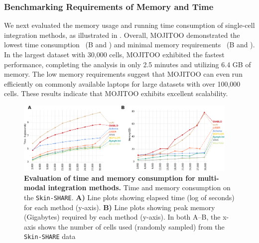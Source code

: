 \subsubsection{Benchmarking Requirements of Memory and Time}
We next evaluated the memory usage and running time consumption of single-cell integration methods, as illustrated in . Overall, MOJITOO demonstrated the lowest time consumption ~(B and ) and minimal memory requirements ~(B and ). In the largest dataset with 30,000 cells, MOJITOO exhibited the fastest performance, completing the analysis in only 2.5 minutes and utilizing 6.4 GB of memory. The low memory requirements suggest that MOJITOO can even run efficiently on commonly available laptops for large datasets with over 100,000 cells. These results indicate that MOJITOO exhibits excellent scalability.
\begin{figure}[!ht]
	\centering
	\includegraphics[width=0.95\textwidth]{time_memory/fig}
	\vspace{0.1cm}
	\caption[Evaluation of time and memory consumption for multi-modal integration methods.]{\textbf{Evaluation of time and memory consumption for multi-modal integration methods.} Time and memory consumption on the \texttt{Skin-SHARE}. \textbf{A)} Line plots showing elapsed time (log of seconds) for each method (y-axis). \textbf{B)} Line plots showing peak memory (Gigabytes) required by each method (y-axis). In both A–B, the x-axis shows the number of cells used (randomly sampled) from the \texttt{Skin-SHARE} data}
	\label{fig:time_memory}
\end{figure}



